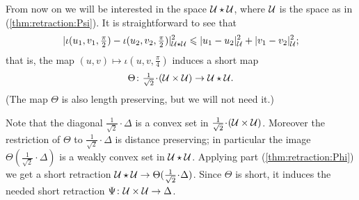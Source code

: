\documentclass[oneside,a4paper, 12pt]{article}
\begin{document}
From now on we will be interested in the space $\mathcal{U}\star\mathcal{U}$, where $\mathcal{U}$ is the space as in (\ref{thm:retraction:Psi}).
It is straightforward to see that 
\[|\iota(u_1,v_1,\tfrac\pi2)-\iota(u_2,v_2,\tfrac\pi2)|^2_{\mathcal{U}\star\mathcal{U}}\leqslant |u_1-u_2|^2_{\mathcal{U}}+|v_1-v_2|_{\mathcal{U}}^2;\]
that is, the map $(u,v)\mapsto \iota(u,v,\tfrac\pi4)$ induces a short map 
\[\Theta\:{\tfrac1{\sqrt{2}}}\cdot(\spc{U}\times\spc{U})\to\spc{U}\star\spc{U}.\]
(The map $\Theta$ is also length preserving, but we will not need it.)

Note that the diagonal $\tfrac1{\sqrt{2}}\cdot\Delta$ is a convex set in $\tfrac1{\sqrt{2}}\cdot(\spc{U}\times\spc{U})$.
Moreover the restriction of $\Theta$ to $\tfrac1{\sqrt{2}}\cdot\Delta$ is distance preserving;
in particular the image $\Theta(\tfrac1{\sqrt{2}}\cdot\Delta)$ is a weakly convex set in $\mathcal{U}\star\mathcal{U}$.
Applying part (\ref{thm:retraction:Phi}) we get a short retraction $\spc{U}\star\spc{U}\to \Theta(\tfrac1{\sqrt{2}}\cdot\Delta)$.
Since $\Theta$ is short, it induces the needed short retraction $\Psi\colon\mathcal{U}\times\mathcal{U}\to \Delta$.


{\small\sloppy

\printbibliography[heading=bibintoc]

}
\end{document}
